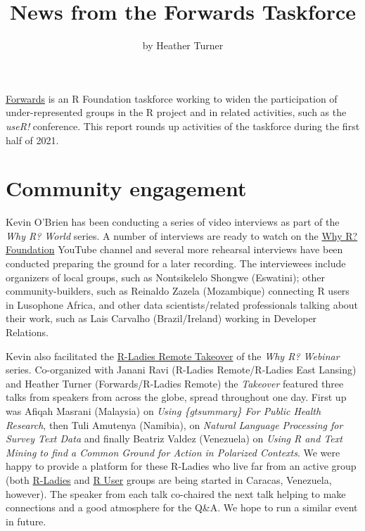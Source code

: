 \title{News from the Forwards Taskforce}
\author{by Heather Turner}

\maketitle

\href{https://forwards.github.io/}{Forwards} is an R Foundation taskforce working to widen the participation of under-represented groups in the R project and in related activities, such as the \emph{useR!} conference. This report rounds up activities of the taskforce during the first half of 2021.

\section{Community engagement}

Kevin O'Brien has been conducting a series of video interviews as part of the \emph{Why R? World} series. A number of interviews are ready to watch on the \href{https://www.youtube.com/playlist?list=PLKMUlj_pGn_mpO0B7eH9ao6SbPg0eLWLG}{Why R? Foundation} YouTube channel and several more rehearsal interviews have been conducted preparing the ground for a later recording. The interviewees include organizers of local groups, such as Nontsikelelo Shongwe (Eswatini); other community-builders, such as Reinaldo Zazela (Mozambique) connecting R users in Lusophone Africa, and other data scientists/related professionals talking about their work, such as Lais Carvalho (Brazil/Ireland) working in Developer Relations.

Kevin also facilitated the \href{https://www.youtube.com/c/WhyRFoundationVideos/search?query=\%22R-Ladies\%20Remote\%20Takeover\%22}{R-Ladies Remote Takeover} of the \emph{Why R? Webinar} series. Co-organized with Janani Ravi (R-Ladies Remote/R-Ladies East Lansing) and Heather Turner (Forwards/R-Ladies Remote) the \emph{Takeover} featured three talks from speakers from across the globe, spread throughout one day. First up was Afiqah Masrani (Malaysia) on \emph{Using \{gtsummary\} For Public Health Research}, then Tuli Amutenya (Namibia), on \emph{Natural Language Processing for Survey Text Data} and finally Beatriz Valdez (Venezuela) on \emph{Using R and Text Mining to find a Common Ground for Action in Polarized Contexts}. We were happy to provide a platform for these R-Ladies who live far from an active group (both \href{https://www.meetup.com/rladies-caracas/}{R-Ladies} and \href{https://twitter.com/GrupoRVenezuela}{R User} groups are being started in Caracas, Venezuela, however). The speaker from each talk co-chaired the next talk helping to make connections and a good atmosphere for the Q\&A. We hope to run a similar event in future.

